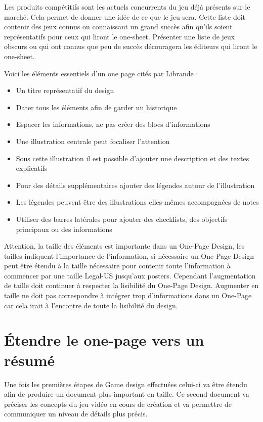 Les produits compétitifs sont les actuels concurrents du jeu déjà présents sur le marché. Cela permet de donner une idée de ce que le jeu sera. Cette liste doit contenir des jeux connus ou connaissant un grand succès afin qu'ils soient représentatifs pour ceux qui liront le one-sheet. Présenter une liste de jeux obscurs ou qui ont connus que peu de succès découragera les éditeurs qui liront le one-sheet.

Voici les éléments essentiels d'un one page cités par Librande \cite{onepage_librande}:
\begin{itemize}
    \item Un titre représentatif du design
    \item Dater tous les éléments afin de garder un historique
    \item Espacer les informations, ne pas créer des blocs d'informations
    \item Une illustration centrale peut focaliser l'attention
    \item Sous cette illustration il est possible d'ajouter une description et des textes explicatifs
    \item Pour des détails supplémentaires ajouter des légendes autour de l'illustration
    \item Les légendes peuvent être des illustrations elles-mêmes accompagnées de notes
    \item Utiliser des barres latérales pour ajouter des checklists, des objectifs principaux ou des informations
\end{itemize}
Attention, la taille des éléments est importante dans un One-Page Design, les tailles indiquent l'importance de l'information, si nécessaire un One-Page Design peut être étendu à la taille nécessaire pour contenir toute l'information à commencer par une taille Legal-US jusqu'aux posters.
Cependant l'augmentation de taille doit continuer à respecter la lisibilité du One-Page Design. Augmenter en taille ne doit pas correspondre à intégrer trop d'informations dans un One-Page car cela irait à l'encontre de toute la lisibilité du design.



\section{Étendre le one-page vers un résumé}
Une fois les premières étapes de Game design effectuées celui-ci va être étendu afin de produire un document plus important en taille. Ce second document va préciser les concepts du jeu vidéo en cours de création et va permettre de communiquer un niveau de détails plus précis.

